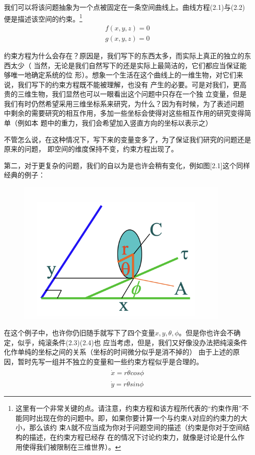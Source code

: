 \documentclass[a4paper, 10pt, openany]{book}%
\begin{document}
我们可以将该问题抽象为一个点被固定在一条空间曲线上。曲线方程(2.1)与(2.2)便是描述该空间的约束。\footnote{这里有一个非常关键的点。请注意，约束方程和该方程所代表的“约束作用”不
能同时出现在你的问题中。即，如果你要计算一个与约束A对应的约束力的大小，那么该约
束A就不应当成为你对于问题空间的描述（约束是你对于空间结构的描述，在约束方程已经存
在的情况下讨论约束力，就像是讨论是什么作用使得我们被限制在三维世界）。}
\begin{align}
  f(x,y,z)=0 \\
  g(x,y,z)=0
\end{align}



约束方程为什么会存在？原因是，我们写下的东西太多，而实际上真正的独立的东西太少（
当然，无论是我们自然写下的还是实际上最简洁的，它们都应当保证能够唯一地确定系统的位
形）。想象一个生活在这个曲线上的一维生物，对它们来说，我们写下的约束方程既不能被理解，也没有
产生的必要。可是对我们，更高贵的三维生物，我们显然也可以一眼看出这个问题中只存在一个独
立变量，但是我们有时仍然希望采用三维坐标系来研究，为什么？因为有时候，为了表述问题
中剩余的需要研究的相互作用，多加一些坐标会使得对这些相互作用的研究变得简单（例如本
题中的重力，我们会希望加入竖直方向的坐标以表示之）

不管怎么说，在这种情况下，写下来的变量变多了，为了保证我们研究的问题还是原来的问题，
即空间的维度保持不变，约束方程出现了。



第二，对于更复杂的问题，我们的自以为是也许会稍有变化，例如图[2.1]这个同样经典的例子：
\begin{figure}[ht]
  \centering 
  \includegraphics[width=10.5cm]{2.png}
  \caption{}
  \end{figure}

在这个例子中，也许你仍旧随手就写下了四个变量$x, y, \theta, \phi$。但是你也许会不确定，似乎，纯滚条件(2.3)(2.4)也
应当考虑，但是，我们又好像没办法把纯滚条件化作单纯的坐标之间的关系（坐标的时间微分似乎是消不掉的）
由于上述的原因，暂时先写一组并不独立的变量和一些约束方程似乎是合理的。
\begin{align}
  \dot{x}=r\dot{\theta}cos\phi \\
  \dot{y}=r\dot{\theta}sin\phi
\end{align}
\end{document}
